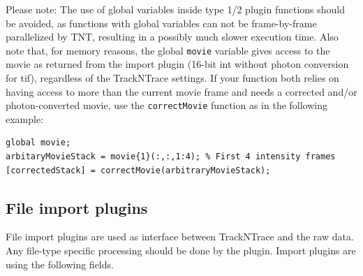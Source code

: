 \documentclass[11pt,onside]{report}
\numberwithin{equation}{chapter}
\begin{document}
Please note: The use of global variables inside type 1/2 plugin functions should be avoided, as functions with global variables can not be frame-by-frame parallelized by TNT, resulting in a possibly much slower execution time. Also note that, for memory reasons, the global \texttt{movie} variable gives access to the movie as returned from the import plugin (16-bit int without photon conversion for tif), regardless of the TrackNTrace settings. If your function both relies on having access to more than the current movie frame and needs a corrected and/or photon-converted movie, use the \texttt{correctMovie} function as in the following example:
\begin{lstlisting}[style=Matlab-editor]
global movie;
arbitaryMovieStack = movie{1}(:,:,1:4); % First 4 intensity frames
[correctedStack] = correctMovie(arbitraryMovieStack);
\end{lstlisting}

\subsection{File import plugins}\label{sec:importPlugin_syntax}
File import plugins are used as interface between TrackNTrace and the raw data. Any file-type specific processing should be done by the plugin. 
Import plugins are using the following fields.
\end{document}
